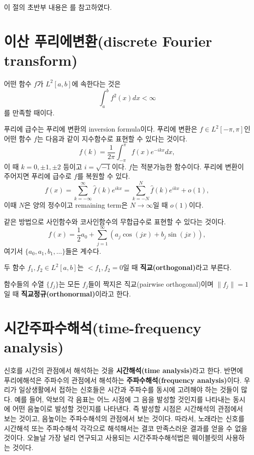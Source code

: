 \documentclass[b5paper,]{scrbook}
\theoremstyle{plain}
\theoremstyle{definition}
\numberwithin{equation}{section}
\let\BeginKnitrBlock\begin \let\EndKnitrBlock\end
\begin{document}
이 절의 초반부 내용은 \citep{Ogden2012}를 참고하였다.

\hypertarget{-discrete-fourier-transform}{%
\section{이산 푸리에변환(discrete Fourier transform)}\label{-discrete-fourier-transform}}

\BeginKnitrBlock{definition}[L2]
\protect\hypertarget{def:unnamed-chunk-250}{}{\label{def:unnamed-chunk-250} {} }어떤 함수 \(f\)가 \(L^{2}[a,b]\)에 속한다는 것은
\[\int_{a}^{b}f^{2}(x)dx <\infty\]
를 만족할 때이다.
\EndKnitrBlock{definition}

푸리에 급수는 푸리에 변환의 inversion formula이다. \citep{Jiang2010} 푸리에 변환은 \(f\in L^{2}[-\pi, \pi]\)인 어떤 함수 \(f\)는 다음과 같이 지수함수로 표현할 수 있다는 것이다.
\[\hat{f}(k)=\frac{1}{2\pi}\int_{-\pi}^{\pi}f(x)e^{-ikx}dx,\]
이 때 \(k=0,\pm 1, \pm 2\) 등이고 \(i=\sqrt{-1}\)이다. \(f\)는 적분가능한 함수이다. 푸리에 변환이 주어지면 푸리에 급수로 \(f\)를 복원할 수 있다.
\[f(x)=\sum_{k=-\infty}^{\infty}\hat{f}(k)e^{ikx}=\sum_{k=-N}^{N}\hat{f}(k)e^{ikx}+o(1),\]
이때 \(N\)은 양의 정수이고 remaining term은 \(N\rightarrow\infty\)일 때 \(o(1)\)이다.

같은 방법으로 사인함수와 코사인함수의 무합급수로 표현할 수 있다는 것이다.
\[f(x)=\frac{1}{2}a_{0}+\sum_{j=1}^{\infty}(a_{j}\cos (jx) + b_{j}\sin (jx)),\]
여기서 \(\{ a_{0}, a_{1}, b_{1}, \ldots \}\)들은 계수다.

\BeginKnitrBlock{definition}[직교]
\protect\hypertarget{def:unnamed-chunk-251}{}{\label{def:unnamed-chunk-251} {} }두 함수 \(f_{1},f_{2}\in L^{2}[a,b]\)는 \(<f_{1},f_{2}=0\)일 때 \textbf{직교(orthogonal)}라고 부른다.
\EndKnitrBlock{definition}

\BeginKnitrBlock{definition}[직교정규]
\protect\hypertarget{def:unnamed-chunk-252}{}{\label{def:unnamed-chunk-252} {} }함수들의 수열 \(\{ f_{j} \}\)는 모든 \(f_{j}\)들이 짝지은 직교(pairwise orthogonal)이며 \(\| f_{j}\|=1\)일 때 \textbf{직교정규(orthonormal)}이라고 한다.
\EndKnitrBlock{definition}

\hypertarget{time-frequency-analysis}{%
\section{시간주파수해석(time-frequency analysis)}\label{time-frequency-analysis}}

신호를 시간의 관점에서 해석하는 것을 \textbf{시간해석(time analysis)}라고 한다. 반면에 푸리에해석은 주파수의 관점에서 해석하는 \textbf{주파수해석(frequency analysis)}이다. 우리가 일상생활에서 접하는 신호들은 시간과 주파수를 동시에 고려해야 하는 것들이 많다. 예를 들어, 악보의 각 음표는 어느 시점에 그 음을 발성할 것인지를 나타내는 동시에 어떤 음높이로 발성할 것인지를 나타낸다. 즉 발성할 시점은 시간해석의 관점에서 보는 것이고, 음높이는 주파수해석의 관점에서 보는 것이다. 따라서, 노래라는 신호를 시간해석 또는 주파수해석 각각으로 해석해서는 결코 만족스러운 결과를 얻을 수 없을 것이다. 오늘날 가장 널리 연구되고 사용되는 시간주파수해석법은 웨이블릿의 사용하는 것이다.
\end{document}

